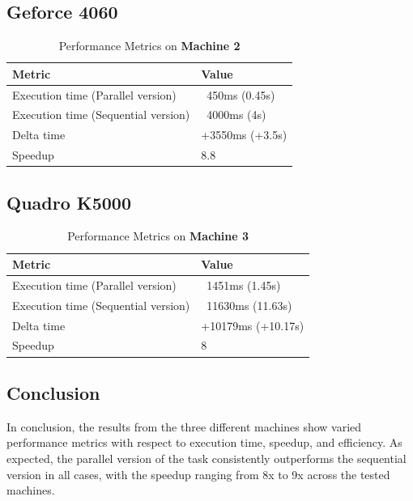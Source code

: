 \subsection{Geforce 4060}
\begin{table}[H]
    \centering
    \begin{tabular}{|l|l|}
    \hline
    \textbf{Metric}                         & \textbf{Value}                       \\ \hline
    Execution time (Parallel version)       & ~450ms (0.45s)                        \\ \hline
    Execution time (Sequential version)     & ~4000ms (4s)                          \\ \hline
    Delta time                               & +3550ms (+3.5s)                       \\ \hline
    Speedup                                  & 8.8                                   \\ \hline
    \end{tabular}
    \caption{Performance Metrics on \textbf{Machine 2}}
    \label{tab:performance_metrics_test1_machine2}
    \end{table}
    
\subsection{Quadro K5000}
\begin{table}[H]
    \centering
    \begin{tabular}{|l|l|}
    \hline
    \textbf{Metric}                         & \textbf{Value}                       \\ \hline
    Execution time (Parallel version)       & ~1451ms (1.45s)                       \\ \hline
    Execution time (Sequential version)     & ~11630ms (11.63s)                     \\ \hline
    Delta time                               & +10179ms (+10.17s)                    \\ \hline
    Speedup                                  & 8                                     \\ \hline
    \end{tabular}
    \caption{Performance Metrics on \textbf{Machine 3}}
    \label{tab:performance_metrics_test1_machine3}
    \end{table}
    
\subsection{Conclusion}
In conclusion, the results from the three different machines show varied performance metrics with respect to execution time, speedup, and efficiency. As expected, the parallel version of the task consistently outperforms the sequential version in all cases, with the speedup ranging from 8x to 9x across the tested machines. 

